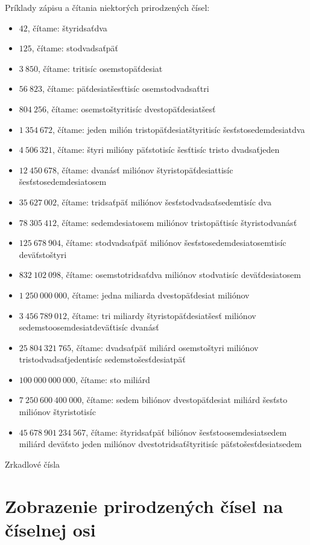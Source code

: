 \documentclass{report}
\begin{document}
Príklady zápisu a čítania niektorých prirodzených čísel:
\begin{itemize}
  \item \(42\), čítame: štyridsaťdva
  \item \(125\), čítame: stodvadsaťpäť
  \item \(3\ 850\), čítame: tritisíc osemstopäťdesiat
  \item \(56\ 823\), čítame: päťdesiatšesťtisíc osemstodvadsaťtri
  \item \(804\ 256\), čítame: osemstoštyritisíc dvestopäťdesiatšesť
  \item \(1\ 354\ 672\), čítame: jeden milión tristopäťdesiatštyritisíc šesťstosedemdesiatdva
  \item \(4\ 506\ 321\), čítame: štyri milióny päťstotisíc šesťtisíc tristo dvadsaťjeden
  \item \(12\ 450\ 678\), čítame: dvanásť miliónov štyristopäťdesiattisíc šesťstosedemdesiatosem
  \item \(35\ 627\ 002\), čítame: tridsaťpäť miliónov šesťstodvadsaťsedemtisíc dva
  \item \(78\ 305\ 412\), čítame: sedemdesiatosem miliónov tristopäťtisíc štyristodvanásť
  \item \(125\ 678\ 904\), čítame: stodvadsaťpäť miliónov šesťstosedemdesiatosemtisíc deväťstoštyri
  \item \(832\ 102\ 098\), čítame: osemstotridsaťdva miliónov stodvatisíc deväťdesiatosem
  \item \(1\ 250\ 000\ 000\), čítame: jedna miliarda dvestopäťdesiat miliónov
  \item \(3\ 456\ 789\ 012\), čítame: tri miliardy štyristopäťdesiatšesť miliónov sedemstoosemdesiatdeväťtisíc dvanásť
  \item \(25\ 804\ 321\ 765\), čítame: dvadsaťpäť miliárd osemstoštyri miliónov tristodvadsaťjedentisíc sedemstošesťdesiatpäť
  \item \(100\ 000\ 000\ 000\), čítame: sto miliárd
  \item \(7\ 250\ 600\ 400\ 000\), čítame: sedem biliónov dvestopäťdesiat miliárd šesťsto miliónov štyristotisíc
  \item \(45\ 678\ 901\ 234\ 567\), čítame: štyridsaťpäť biliónov šesťstoosemdesiatsedem miliárd deväťsto jeden miliónov dvestotridsaťštyritisíc päťstošesťdesiatsedem
\end{itemize}

Zrkadlové čísla

\section{Zobrazenie prirodzených čísel na číselnej osi}
\end{document}
